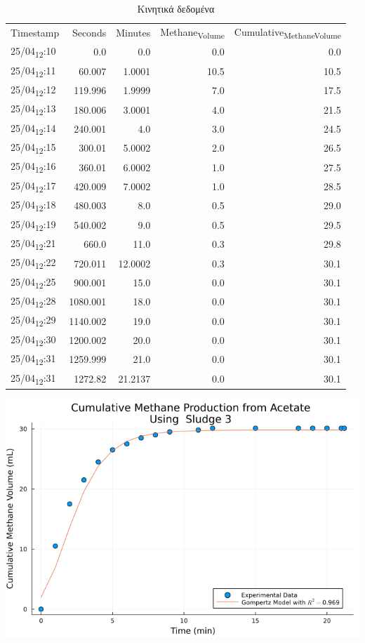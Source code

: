 \documentclass[11pt]{article}
\begin{document}
\begin{table}[htbp]
\caption{Κινητικά δεδομένα}
\centering
\begin{tabular}{lrrrr}
Timestamp & Seconds & Minutes & Methane\textsubscript{Volume} & Cumulative\textsubscript{Methane}\textsubscript{Volume}\\[0pt]
25/04\textsubscript{12}:10 & 0.0 & 0.0 & 0.0 & 0.0\\[0pt]
25/04\textsubscript{12}:11 & 60.007 & 1.0001 & 10.5 & 10.5\\[0pt]
25/04\textsubscript{12}:12 & 119.996 & 1.9999 & 7.0 & 17.5\\[0pt]
25/04\textsubscript{12}:13 & 180.006 & 3.0001 & 4.0 & 21.5\\[0pt]
25/04\textsubscript{12}:14 & 240.001 & 4.0 & 3.0 & 24.5\\[0pt]
25/04\textsubscript{12}:15 & 300.01 & 5.0002 & 2.0 & 26.5\\[0pt]
25/04\textsubscript{12}:16 & 360.01 & 6.0002 & 1.0 & 27.5\\[0pt]
25/04\textsubscript{12}:17 & 420.009 & 7.0002 & 1.0 & 28.5\\[0pt]
25/04\textsubscript{12}:18 & 480.003 & 8.0 & 0.5 & 29.0\\[0pt]
25/04\textsubscript{12}:19 & 540.002 & 9.0 & 0.5 & 29.5\\[0pt]
25/04\textsubscript{12}:21 & 660.0 & 11.0 & 0.3 & 29.8\\[0pt]
25/04\textsubscript{12}:22 & 720.011 & 12.0002 & 0.3 & 30.1\\[0pt]
25/04\textsubscript{12}:25 & 900.001 & 15.0 & 0.0 & 30.1\\[0pt]
25/04\textsubscript{12}:28 & 1080.001 & 18.0 & 0.0 & 30.1\\[0pt]
25/04\textsubscript{12}:29 & 1140.002 & 19.0 & 0.0 & 30.1\\[0pt]
25/04\textsubscript{12}:30 & 1200.002 & 20.0 & 0.0 & 30.1\\[0pt]
25/04\textsubscript{12}:31 & 1259.999 & 21.0 & 0.0 & 30.1\\[0pt]
25/04\textsubscript{12}:31 & 1272.82 & 21.2137 & 0.0 & 30.1\\[0pt]
\end{tabular}
\end{table}

\begin{center}
\includegraphics[width=.9\linewidth]{../plots/BMPs/Acetate/methane_kinetics_acet_test_s3_min.png}
\end{center}
\end{document}

